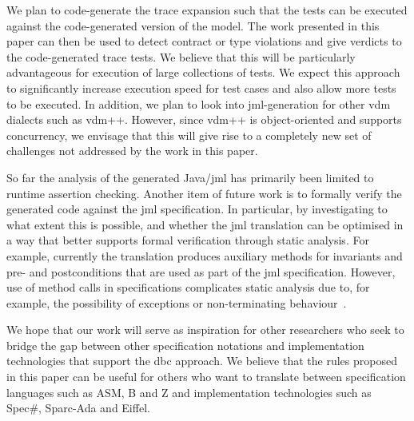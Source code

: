 We plan to code-generate the trace expansion such that the 
tests can be executed against the code-generated version of the
model. The work presented in this paper can then be used to detect
contract or type violations and give verdicts to the code-generated
trace tests. We believe that this will be particularly advantageous
for execution of large collections of tests. We expect this approach
to significantly increase execution speed for test cases and also
allow more tests to be executed. In addition, we plan to look into
\ac{jml}-generation for other \ac{vdm} dialects such as
\ac{vdm}++. However, since \ac{vdm}++ is object-oriented and supports
concurrency, we envisage that this will give rise to a completely new
set of challenges not addressed by the work in this paper.

So far the analysis of the generated Java/\ac{jml} has primarily been
limited to runtime assertion checking. Another item of future work is
to formally verify the generated code against the \ac{jml}
specification. In particular, by investigating to what extent this is
possible, and whether the \ac{jml} translation can be optimised in a
way that better supports formal verification through static
analysis. For example, currently the translation produces auxiliary
methods for invariants and pre- and postconditions that are used as
part of the \ac{jml} specification. However, use of method calls in
specifications complicates static analysis due to, for example, the
possibility of exceptions or non-terminating behaviour~\cite{Cok05}.
  
We hope that our work will serve as inspiration for other researchers
who seek to bridge the gap between other specification notations and
implementation technologies that support the \ac{dbc} approach. We
believe that the rules proposed in this paper can be useful for others
who want to translate between specification languages such as ASM, B
and Z and implementation technologies such as Spec\#, Sparc-Ada and
Eiffel.

